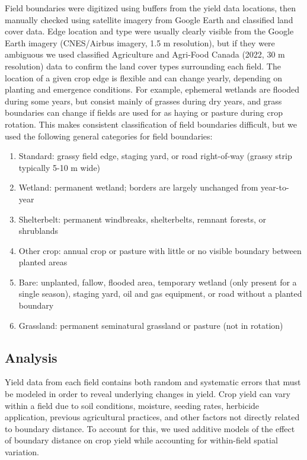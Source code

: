 \documentclass[]{elsarticle} %
\providecommand{\tightlist}{%
  \setlength{\itemsep}{0pt}\setlength{\parskip}{0pt}}
\begin{document}
Field boundaries were digitized using buffers from the yield data locations, then manually checked using satellite imagery from Google Earth and classified land cover data.
Edge location and type were usually clearly visible from the Google Earth imagery (CNES/Airbus imagery, 1.5 m resolution), but if they were ambiguous we used classified Agriculture and Agri-Food Canada (2022, 30 m resolution) data to confirm the land cover types surrounding each field.
The location of a given crop edge is flexible and can change yearly, depending on planting and emergence conditions.
For example, ephemeral wetlands are flooded during some years, but consist mainly of grasses during dry years, and grass boundaries can change if fields are used for as haying or pasture during crop rotation.
This makes consistent classification of field boundaries difficult, but we used the following general categories for field boundaries:

\begin{enumerate}
\def\labelenumi{\arabic{enumi}.}
\tightlist
\item Standard: grassy field edge, staging yard, or road right-of-way (grassy strip typically 5-10 m wide)
\item Wetland: permanent wetland; borders are largely unchanged from year-to-year
\item Shelterbelt: permanent windbreaks, shelterbelts, remnant forests, or shrublands
\item Other crop: annual crop or pasture with little or no visible boundary between planted areas
\item Bare: unplanted, fallow, flooded area, temporary wetland (only present for a single season), staging yard, oil and gas equipment, or road without a planted boundary
\item Grassland: permanent seminatural grassland or pasture (not in rotation)
\end{enumerate}

\hypertarget{analysis}{%
\subsection{Analysis}\label{analysis}}

Yield data from each field contains both random and systematic errors that must be modeled in order to reveal underlying changes in yield.
Crop yield can vary within a field due to soil conditions, moisture, seeding rates, herbicide application, previous agricultural practices, and other factors not directly related to boundary distance.
To account for this, we used additive models of the effect of boundary distance on crop yield while accounting for within-field spatial variation.
\end{document}
